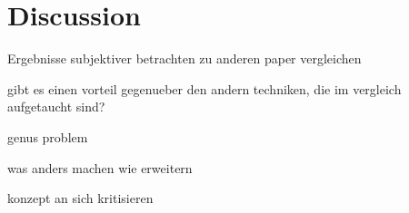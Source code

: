 \chapter{Discussion}
\label{sec:dicussion}

Ergebnisse subjektiver betrachten
zu anderen paper vergleichen

gibt es einen vorteil gegenueber den andern techniken, die im vergleich aufgetaucht sind?

genus problem

was anders machen
wie erweitern

konzept an sich kritisieren
